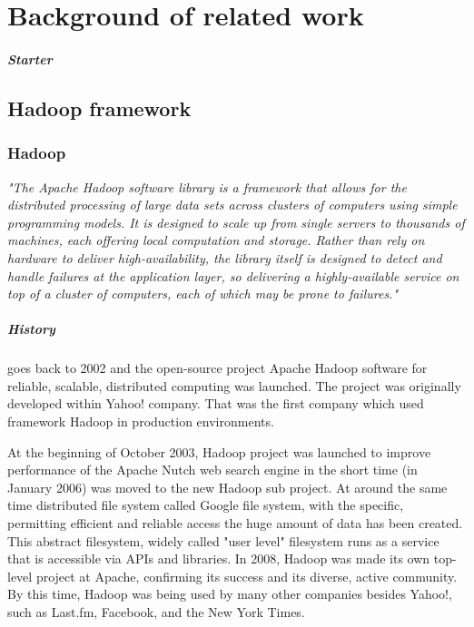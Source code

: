 \documentclass[a4paper,12pt,oneside]{report}
\begin{document}
 



\newpage
\chapter*{Background of related work}
\paragraph*{Starter}

\section{Hadoop framework}
		\subsection*{Hadoop}
		 \emph{"The Apache Hadoop software library is a framework that allows for the distributed
		  processing of large data sets across clusters of computers using simple programming 
		  models. It is designed to scale up from single servers to 
		 thousands of machines, each offering local computation and storage. Rather than rely 
		 on hardware to deliver high-availability, the library itself is
		  designed to detect and handle failures at the application layer, so delivering a 
		  highly-available service on top of a cluster of computers,
		  each of which may be prone to failures."}
		\paragraph*{History}goes back to 2002 and the 
open-source project Apache Hadoop software for reliable, scalable,
distributed computing was launched. The project was originally
developed within Yahoo! company. That was the first company
which used framework Hadoop in production environments.

At the beginning of October 2003, Hadoop project was launched to improve performance
of the Apache Nutch web search engine in the short time (in January 2006) was moved to the new Hadoop sub project.
At around the same time  distributed file system called Google
file system, with the specific, permitting efficient and reliable access
the huge amount of data has been created. This abstract filesystem, widely called "user level"
filesystem runs as a service that is accessible via APIs and libraries. 
In 2008, Hadoop was made its own top-level project at Apache, confirming its
success and its diverse, active community. By this time, Hadoop was being used by many
other companies besides Yahoo!, such as Last.fm, Facebook, and the New York Times. 
\end{document}
